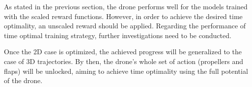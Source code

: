 As stated in the previous section, the drone performs well for the models trained with the scaled reward functions. However, in order to achieve the desired time optimality, an unscaled reward should be applied. Regarding the performance of time optimal training strategy, further investigations need to be conducted. 
\par
Once the 2D case is optimized, the achieved progress will be generalized to the case of 3D trajectories. By then, the drone's whole set of action (propellers and flaps) will be unlocked, aiming to achieve time optimality using the full potential of the drone.